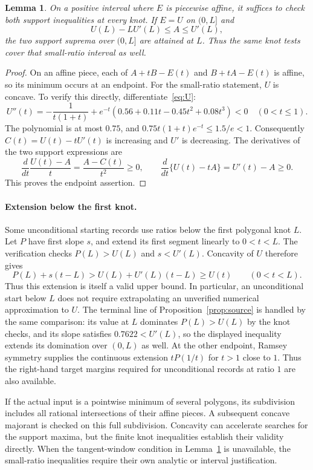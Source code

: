 \documentclass[11pt]{article}
\newtheorem{lemma}[theorem]{Lemma}
\theoremstyle{definition}
\theoremstyle{remark}
\numberwithin{equation}{section}
\begin{document}
\begin{lemma}\label{lem:polygon-support}
On a positive interval where $E$ is piecewise affine, it suffices to check both support inequalities at every knot. If $E=U$ on $(0,L]$ and
\[
 U(L)-LU'(L)\le A\le U'(L),
\]
the two support suprema over $(0,L]$ are attained at $L$. Thus the same knot tests cover that small-ratio interval as well.
\end{lemma}
\begin{proof}
On an affine piece, each of $A+tB-E(t)$ and $B+tA-E(t)$ is affine, so its minimum occurs at an endpoint. For the small-ratio statement, $U$ is concave. To verify this directly, differentiate~\eqref{eq:U}:
\[
 U''(t)=-\frac1{t(1+t)}
 +e^{-t}\left(0.56+0.11t-0.45t^2+0.08t^3\right)<0
 \quad(0<t\le1).
\]
The polynomial is at most $0.75$, and $0.75t(1+t)e^{-t}\le1.5/e<1$. Consequently $C(t)=U(t)-tU'(t)$ is increasing and $U'$ is decreasing. The derivatives of the two support expressions are
\[
 \frac{d}{dt}\frac{U(t)-A}{t}=\frac{A-C(t)}{t^2}\ge0,
 \qquad
 \frac{d}{dt}\{U(t)-tA\}=U'(t)-A\ge0.
\]
This proves the endpoint assertion.
\end{proof}

\paragraph{Extension below the first knot.}
Some unconditional starting records use ratios below the first polygonal
knot $L$. Let $P$ have first slope $s$, and extend its first segment
linearly to $0<t<L$. The verification checks $P(L)>U(L)$ and $s<U'(L)$.
Concavity of $U$ therefore gives
\[
 P(L)+s(t-L)
 >U(L)+U'(L)(t-L)\ge U(t)\qquad(0<t<L).
\]
Thus this extension is itself a valid upper bound. In particular, an
unconditional start below $L$ does not require extrapolating an
unverified numerical approximation to $U$.
The terminal line of Proposition~\ref{prop:source} is handled by the
same comparison: its value at $L$ dominates $P(L)>U(L)$ by the knot
checks, and its slope satisfies $0.7622<U'(L)$, so the displayed
inequality extends its domination over $(0,L)$ as well.
At the other endpoint, Ramsey symmetry supplies the continuous extension
$tP(1/t)$ for $t>1$ close to $1$. Thus the right-hand target margins
required for unconditional records at ratio $1$ are also available.

If the actual input is a pointwise minimum of several polygons, its subdivision includes all rational intersections of their affine pieces. A subsequent concave majorant is checked on this full subdivision. Concavity can accelerate searches for the support maxima, but the finite knot inequalities establish their validity directly. When the tangent-window condition in Lemma~\ref{lem:polygon-support} is unavailable, the small-ratio inequalities require their own analytic or interval justification.
\end{document}
